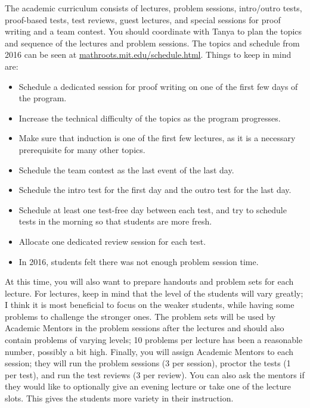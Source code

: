 \documentclass[10pt]{amsart}
\begin{document}
The academic curriculum consists of lectures, problem sessions, intro/outro tests, proof-based tests, test reviews, guest lectures, and special sessions for proof writing and a team contest.  You should coordinate with Tanya to plan the topics and sequence of the lectures and problem sessions.  The topics and schedule from 2016 can be seen at \url{mathroots.mit.edu/schedule.html}.  Things to keep in mind are:
\begin{itemize}
\item Schedule a dedicated session for proof writing on one of the first few days of the program.

\item Increase the technical difficulty of the topics as the program progresses.

\item Make sure that induction is one of the first few lectures, as it is a necessary prerequisite for many other topics.

\item Schedule the team contest as the last event of the last day.

\item Schedule the intro test for the first day and the outro test for the last day.

\item Schedule at least one test-free day between each test, and try to schedule tests in the morning so that students are more fresh.

\item Allocate one dedicated review session for each test.

\item In 2016, students felt there was not enough problem session time.
\end{itemize}
At this time, you will also want to prepare handouts and problem sets for each lecture. For lectures, keep in mind that the level of the students will vary greatly; I think it is most beneficial to focus on the weaker students, while having some problems to challenge the stronger ones.  The problem sets will be used by Academic Mentors in the problem sessions after the lectures and should also contain problems of varying levels; 10 problems per lecture has been a reasonable number, possibly a bit high.  Finally, you will assign Academic Mentors to each session; they will run the problem sessions (3 per session), proctor the tests (1 per test), and run the test reviews (3 per review).  You can also ask the mentors if they would like to optionally give an evening lecture or take one of the lecture slots.  This gives the students more variety in their instruction.
\end{document}
